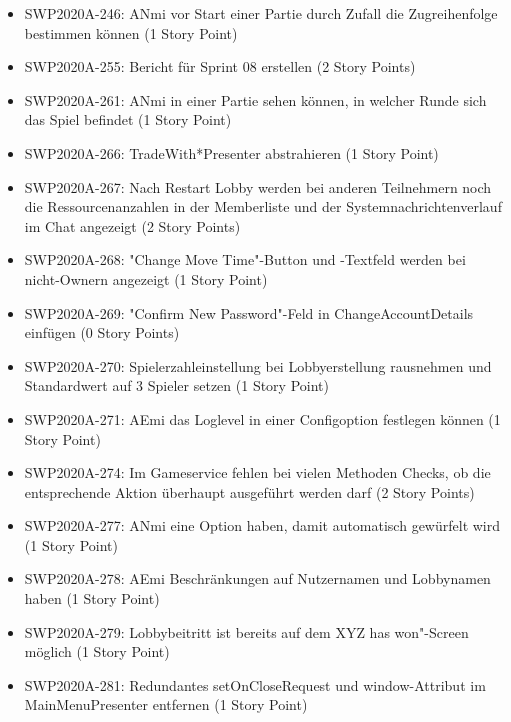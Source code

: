 \documentclass[12pt,a4paper, oneside]{article}
\begin{document}
\begin{itemize}
        \item SWP2020A-246:	ANmi vor Start einer Partie durch Zufall die Zugreihenfolge bestimmen können (1 Story Point)

        \item SWP2020A-255:	Bericht für Sprint 08 erstellen (2 Story Points)

        \item SWP2020A-261:	ANmi in einer Partie sehen können, in welcher Runde sich das Spiel befindet (1 Story Point)

        \item SWP2020A-266:	TradeWith*Presenter abstrahieren (1 Story Point)

        \item SWP2020A-267:	Nach Restart Lobby werden bei anderen Teilnehmern noch die Ressourcenanzahlen in der Memberliste und der Systemnachrichtenverlauf im Chat angezeigt (2 Story Points)

        \item SWP2020A-268:	"Change Move Time"-Button und -Textfeld werden bei nicht-Ownern angezeigt (1 Story Point)

        \item SWP2020A-269:	"Confirm New Password"-Feld in ChangeAccountDetails einfügen (0 Story Points)

        \item SWP2020A-270:	Spielerzahleinstellung bei Lobbyerstellung rausnehmen und Standardwert auf 3 Spieler setzen (1 Story Point)

        \item SWP2020A-271:	AEmi das Loglevel in einer Configoption festlegen können (1 Story Point)

        \item SWP2020A-274:	Im Gameservice fehlen bei vielen Methoden Checks, ob die entsprechende Aktion überhaupt ausgeführt werden darf (2 Story Points)

        \item SWP2020A-277:	ANmi eine Option haben, damit automatisch gewürfelt wird (1 Story Point)

        \item SWP2020A-278:	AEmi Beschränkungen auf Nutzernamen und Lobbynamen haben (1 Story Point)

        \item SWP2020A-279:	Lobbybeitritt ist bereits auf dem XYZ has won"-Screen möglich (1 Story Point)

        \item SWP2020A-281:	Redundantes setOnCloseRequest und window-Attribut im MainMenuPresenter entfernen (1 Story Point)


\end{itemize}
\end{document}
